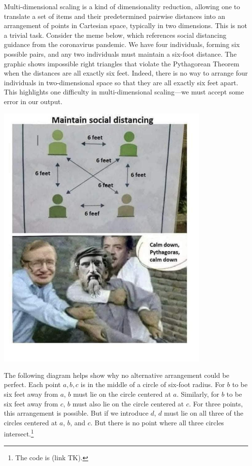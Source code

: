 
Multi-dimensional scaling is a kind of dimensionality reduction, allowing one to translate a set of items and their predetermined pairwise distances into an arrangement of points in Cartesian space, typically in two dimensions. This is not a trivial task. Consider the meme below, which references social distancing guidance from the coronavirus pandemic. We have four individuals, forming six possible pairs, and any two individuals must maintain a six-foot distance. The graphic shows impossible right triangles that violate the Pythagorean Theorem when the distances are all exactly six feet. Indeed, there is no way to arrange four individuals in two-dimensional space so that they are all exactly six feet apart. This highlights one difficulty in multi-dimensional scaling---we must accept some error in our output. 

\begin{center}
    \includegraphics[width = 0.8\textwidth]{images/calmdownpythag.jpg}
\end{center}

\vspace{-2cm}

The following diagram helps show why no alternative arrangement could be perfect. Each point $a,b,c$ is in the middle of a circle of six-foot radius. For $b$ to be six feet away from $a$, $b$ must lie on the circle centered at $a$. Similarly, for $b$ to be six feet away from $c$, $b$ must also lie on the circle centered at $c$. For three points, this arrangement is possible. But if we introduce $d$, $d$ must lie on all three of the circles centered at $a$, $b$, and $c$. But there is no point where all three circles intersect.\footnote{The code is (link TK).}

